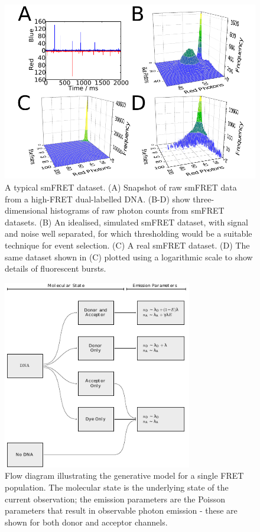 \begin{figure}
   \begin{center}
      \includegraphics*[width=6in]{inference/fig1_intro_graphs.pdf}
      \caption{A typical smFRET dataset. (A) Snapshot of raw smFRET data from a high-FRET dual-labelled DNA. (B-D) show three-dimensional histograms of raw photon counts from smFRET datasets. (B) An idealised, simulated smFRET dataset, with signal and noise well separated, for which thresholding would be a suitable technique for event selection. (C) A real smFRET dataset. (D) The same dataset shown in (C) plotted using a logarithmic scale to show details of fluorescent bursts.}
      \label{fig:figure_diagram_scheme}
   \end{center}
\end{figure}


\begin{figure}
   \begin{center}
      \includegraphics*[width=3.25in]{inference/fig2_model_flow_diagram.pdf}
      \caption{Flow diagram illustrating the generative model for a single FRET population.  The molecular state is the underlying state of the current observation; the emission parameters are the Poisson parameters that result in observable photon emission - these are shown for both donor and acceptor channels.}
      \label{fig:flow_single}
   \end{center}
\end{figure}


